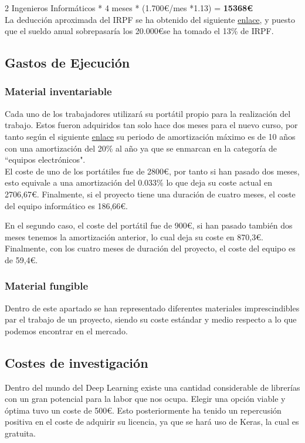 \documentclass[a4paper,12pt,oneside]{article}
\begin{document}
2 Ingenieros Informáticos * 4 meses * (1.700\euro /mes *1.13) = \textbf{15368\euro} \\

La deducción aproximada del IRPF se ha obtenido del siguiente \href{https://infoautonomos.eleconomista.es/contratar-trabajadores/calcular-retenciones-IRPF-nominas/}{enlace}, y puesto que el sueldo anual sobrepasaría los 20.000\euro se ha tomado el 13\% de IRPF.

\subsection*{Gastos de Ejecución}

\subsubsection*{Material inventariable}

Cada uno de los trabajadores utilizará su portátil propio para la realización del trabajo. Estos fueron adquiridos tan solo hace dos meses para el nuevo curso, por tanto según el siguiente \href{https://cuentica.com/asesoria/tabla-anos-y-porcentajes-de-amortizacion-sociedades-a-partir-de-2015/}{enlace} su periodo de amortización máximo es de 10 años con una amortización del 20\% al año ya que se enmarcan en la categoría de ``equipos electrónicos". \\

El coste de uno de los portátiles fue de  2800\euro, por tanto si han pasado dos meses, esto equivale a una amortización del 0.033\% lo que deja su coste actual en 2706,67\euro. Finalmente, si el proyecto tiene una duración de cuatro meses, el coste del equipo informático es 186,66\euro.

En el segundo caso, el coste del portátil fue de 900\euro, si han pasado también dos meses tenemos la amortización anterior, lo cual deja su coste en 870,3\euro. Finalmente, con los cuatro meses de duración del proyecto, el coste del equipo es de 59,4\euro.

\subsubsection*{Material fungible}

Dentro de este apartado se han representado diferentes materiales imprescindibles par el trabajo de un proyecto, siendo su coste estándar y medio respecto a lo que podemos encontrar en el mercado.

\subsection*{Costes de investigación}

Dentro del mundo del Deep Learning existe una cantidad considerable de librerías con un gran potencial para la labor que nos ocupa. Elegir una opción viable y óptima tuvo un coste de 500\euro. Esto posteriormente ha tenido un repercusión positiva en el coste de adquirir su licencia, ya que se hará uso de Keras, la cual es gratuita.
\end{document}
